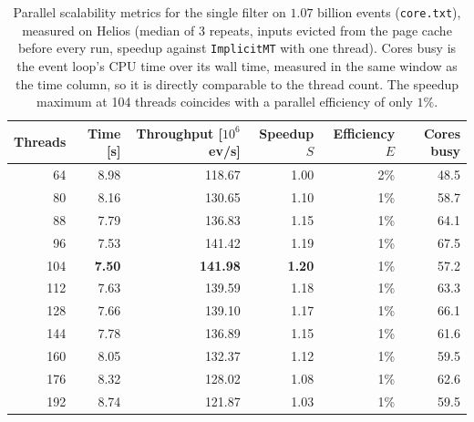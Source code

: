 \begin{table}[htbp]
\centering
\caption{Parallel scalability metrics for the single filter on $1.07$ billion events (\texttt{core.txt}), measured on Helios (median of 3 repeats, inputs evicted from the page cache before every run, speedup against \texttt{ImplicitMT} with one thread). Cores busy is the event loop's CPU time over its wall time, measured in the same window as the time column, so it is directly comparable to the thread count. The speedup maximum at 104 threads coincides with a parallel efficiency of only $1\%$.}
\label{tab:scalability-filter}
\begin{tabular}{rrrrrr}
\toprule
Threads & Time [s] & Throughput [$10^6$ ev/s] & Speedup $S$ & Efficiency $E$ & Cores busy \\
\midrule
64 & 8.98 & 118.67 & 1.00 & 2\% & 48.5 \\
80 & 8.16 & 130.65 & 1.10 & 1\% & 58.7 \\
88 & 7.79 & 136.83 & 1.15 & 1\% & 64.1 \\
96 & 7.53 & 141.42 & 1.19 & 1\% & 67.5 \\
104 & \textbf{7.50} & \textbf{141.98} & \textbf{1.20} & 1\% & 57.2 \\
112 & 7.63 & 139.59 & 1.18 & 1\% & 63.3 \\
128 & 7.66 & 139.10 & 1.17 & 1\% & 66.1 \\
144 & 7.78 & 136.89 & 1.15 & 1\% & 61.6 \\
160 & 8.05 & 132.37 & 1.12 & 1\% & 59.5 \\
176 & 8.32 & 128.02 & 1.08 & 1\% & 62.6 \\
192 & 8.74 & 121.87 & 1.03 & 1\% & 59.5 \\
\bottomrule
\end{tabular}
\end{table}
